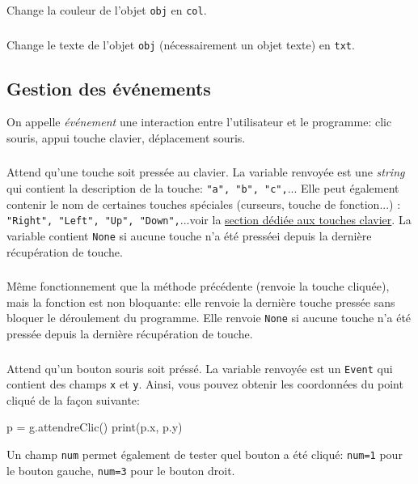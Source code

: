 \documentclass[11pt,a4paper]{article}
\begin{document}
\subsubsection*{}
Change la couleur de l'objet {\tt obj} en {\tt col}.

\subsubsection*{}
Change le texte de l'objet {\tt obj} (nécessairement un objet texte) en {\tt txt}.

\newpage
\subsection*{Gestion des événements}
On appelle {\it événement} une interaction entre l'utilisateur et le programme: clic souris, appui touche clavier, déplacement souris.

\subsubsection*{}
Attend qu'une touche soit pressée au clavier. La variable renvoyée est une {\it string} qui contient la description de la touche: {\tt "a", "b", "c",}... Elle peut également contenir le nom de certaines touches spéciales (curseurs, touche de fonction...) : {\tt "Right", "Left", "Up", "Down",}...voir la \underline{section dédiée aux touches clavier}. La variable contient {\tt None} si aucune touche n'a été presséei depuis la dernière récupération de touche.

\subsubsection*{}
Même fonctionnement que la méthode précédente (renvoie la touche cliquée), mais la fonction est non bloquante: elle renvoie la dernière touche pressée sans bloquer le déroulement du programme. Elle renvoie  {\tt None} si aucune touche n'a été pressée depuis la dernière récupération de touche.

\subsubsection*{}
Attend qu'un bouton souris soit préssé.  La variable renvoyée est un {\tt Event} qui contient des champs {\tt x} et {\tt y}. Ainsi, vous pouvez obtenir les coordonnées du point cliqué de la façon suivante:
\begin{ccode}
    p = g.attendreClic()
    print(p.x, p.y)
\end{ccode}
Un champ {\tt num} permet également de tester quel bouton a été cliqué: {\tt num=1} pour le bouton gauche, {\tt num=3} pour le bouton droit.
\end{document}
